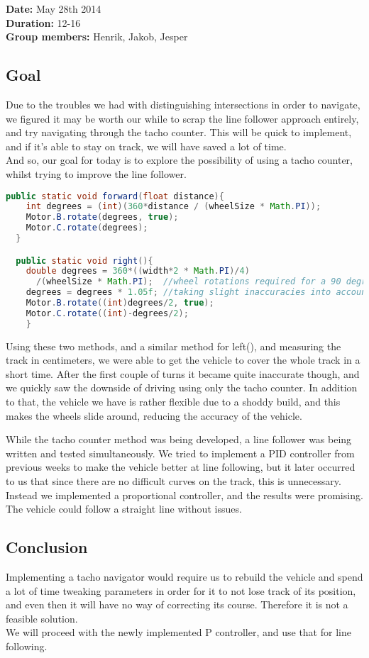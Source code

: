 \textbf{Date:} May 28th 2014\\\textbf{Duration:} 12-16\\\textbf{Group
members:} Henrik, Jakob, Jesper

\subsection{Goal}

Due to the troubles we had with distinguishing intersections in order to
navigate, we figured it may be worth our while to scrap the line
follower approach entirely, and try navigating through the tacho
counter. This will be quick to implement, and if it's able to stay on
track, we will have saved a lot of time.\\And so, our goal for today is
to explore the possibility of using a tacho counter, whilst trying to
improve the line follower.

\begin{lstlisting}[language=java]
  public static void forward(float distance){ 
    int degrees = (int)(360*distance / (wheelSize * Math.PI));
    Motor.B.rotate(degrees, true);
    Motor.C.rotate(degrees);
  }

  public static void right(){
    double degrees = 360*((width*2 * Math.PI)/4)
      /(wheelSize * Math.PI);  //wheel rotations required for a 90 degree turn of the vehicle
    degrees = degrees * 1.05f; //taking slight inaccuracies into account
    Motor.B.rotate((int)degrees/2, true);
    Motor.C.rotate((int)-degrees/2);
    }
\end{lstlisting}

Using these two methods, and a similar method for left(), and measuring
the track in centimeters, we were able to get the vehicle to cover the
whole track in a short time. After the first couple of turns it became
quite inaccurate though, and we quickly saw the downside of driving
using only the tacho counter. In addition to that, the vehicle we have
is rather flexible due to a shoddy build, and this makes the wheels
slide around, reducing the accuracy of the vehicle.

While the tacho counter method was being developed, a line follower was
being written and tested simultaneously. We tried to implement a PID
controller from previous weeks to make the vehicle better at line
following, but it later occurred to us that since there are no difficult
curves on the track, this is unnecessary. Instead we implemented a
proportional controller, and the results were promising. The vehicle
could follow a straight line without issues.

\subsection{Conclusion}

Implementing a tacho navigator would require us to rebuild the vehicle
and spend a lot of time tweaking parameters in order for it to not lose
track of its position, and even then it will have no way of correcting
its course. Therefore it is not a feasible solution.\\We will proceed
with the newly implemented P controller, and use that for line
following.
